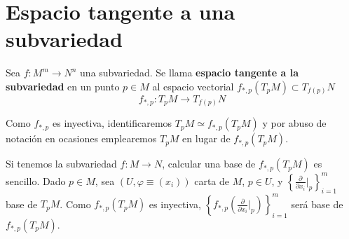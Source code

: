 \section{Espacio tangente a una subvariedad}
\begin{defi}
Sea $f:M^m \to N^n$ una subvariedad. Se llama \textbf{espacio tangente a la subvariedad} en un punto $p \in M$ al espacio vectorial $f_{*,p}(T_pM) \subset T_{f(p)}N$
$$f_{*,p}:T_pM \longrightarrow T_{f(p)}N$$
\end{defi}
\begin{obs}
Como $f_{*,p}$ es inyectiva, identificaremos $T_pM \simeq f_{*,p}(T_pM)$ y por abuso de notación en ocasiones emplearemos $T_pM$ en lugar de $f_{*,p}(T_pM)$.
\end{obs}

Si tenemos la subvariedad $f:M\to N$, calcular una base de $f_{*,p}(T_pM)$ es sencillo. Dado $p \in M$, sea $(U,\varphi\equiv (x_i))$ carta de $M$, $p\in U$, y $\left\{\frac{\partial}{\partial x_i}\big|_p\right\}_{i=1}^m$ base de $T_pM$. Como $f_{*,p}(T_pM)$ es inyectiva, $\left\{f_{*,p}\left(\frac{\partial}{\partial x_i}\big|_p\right)\right\}_{i=1}^m$ será base de $f_{*,p}(T_pM)$.

